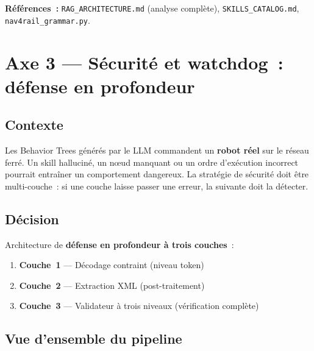 \documentclass[a4paper,11pt]{article}
\newcommand{\file}[1]{\texttt{#1}}
\begin{document}
\textbf{Références~:} \file{RAG\_ARCHITECTURE.md} (analyse complète),
\file{SKILLS\_CATALOG.md}, \file{nav4rail\_grammar.py}.

\newpage
\section{Axe 3 --- Sécurité et watchdog~: défense en profondeur}
\label{sec:securite}

\subsection{Contexte}

Les Behavior Trees générés par le LLM commandent un \textbf{robot réel} sur
le réseau ferré. Un skill halluciné, un nœud manquant ou un ordre
d'exécution incorrect pourrait entraîner un comportement dangereux. La
stratégie de sécurité doit être multi-couche~: si une couche laisse passer
une erreur, la suivante doit la détecter.

\subsection{Décision}

Architecture de \textbf{défense en profondeur à trois couches}~:

\begin{enumerate}
    \item \textbf{Couche~1} --- Décodage contraint (niveau token)
    \item \textbf{Couche~2} --- Extraction XML (post-traitement)
    \item \textbf{Couche~3} --- Validateur à trois niveaux (vérification
    complète)
\end{enumerate}

\subsection{Vue d'ensemble du pipeline}
\end{document}
